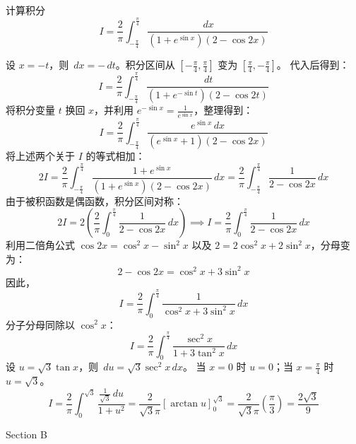 \begin{questions}
\question
计算积分
\[
I = \frac{2}{\pi} \int_{-\frac{\pi}{4}}^{\frac{\pi}{4}} \frac{\,dx}{\left(1 + e^{\sin x}\right)\left(2 - \cos 2x\right)}
\]
\begin{solution}
设 $x = -t$，则 $\,dx = -\,dt$。积分区间从 $\left[-\frac{\pi}{4}, \frac{\pi}{4}\right]$ 变为 $\left[\frac{\pi}{4}, -\frac{\pi}{4}\right]$。
代入后得到：
\[
I = \frac{2}{\pi} \int_{-\frac{\pi}{4}}^{\frac{\pi}{4}} \frac{\,dt}{\left(1 + e^{-\sin t}\right)\left(2 - \cos 2t\right)}
\]
将积分变量 $t$ 换回 $x$，并利用 $e^{-\sin x} = \frac{1}{e^{\sin x}}$，整理得到：
\[
I = \frac{2}{\pi} \int_{-\frac{\pi}{4}}^{\frac{\pi}{4}} \frac{e^{\sin x} \,dx}{\left(e^{\sin x} + 1\right)\left(2 - \cos 2x\right)}
\]
将上述两个关于 $I$ 的等式相加：
\[
2I = \frac{2}{\pi} \int_{-\frac{\pi}{4}}^{\frac{\pi}{4}} \frac{1 + e^{\sin x}}{\left(1 + e^{\sin x}\right)\left(2 - \cos 2x\right)} \,dx = \frac{2}{\pi} \int_{-\frac{\pi}{4}}^{\frac{\pi}{4}} \frac{1}{2 - \cos 2x} \,dx
\]
由于被积函数是偶函数，积分区间对称：
\[
2I = 2 \left( \frac{2}{\pi} \int_0^{\frac{\pi}{4}} \frac{1}{2 - \cos 2x} \,dx \right) \implies I = \frac{2}{\pi} \int_0^{\frac{\pi}{4}} \frac{1}{2 - \cos 2x} \,dx
\]
利用二倍角公式 $\cos 2x = \cos^2 x - \sin^2 x$ 以及 $2 = 2\cos^2 x + 2\sin^2 x$，分母变为：
\[
2 - \cos 2x = \cos^2 x + 3\sin^2 x
\]
因此，
\[
I = \frac{2}{\pi} \int_0^{\frac{\pi}{4}} \frac{1}{\cos^2 x + 3\sin^2 x} \,dx
\]
分子分母同除以 $\cos^2 x$：
\[
I = \frac{2}{\pi} \int_0^{\frac{\pi}{4}} \frac{\sec^2 x}{1 + 3\tan^2 x} \,dx
\]
设 $u = \sqrt{3}\tan x$，则 $\,du = \sqrt{3}\sec^2 x \,dx$。
当 $x = 0$ 时 $u = 0$；当 $x = \frac{\pi}{4}$ 时 $u = \sqrt{3}$。
\[
I = \frac{2}{\pi} \int_0^{\sqrt{3}} \frac{\frac{1}{\sqrt{3}} \,du}{1 + u^2} = \frac{2}{\sqrt{3}\pi} \left[\arctan u\right]_0^{\sqrt{3}} = \frac{2}{\sqrt{3}\pi} \left(\frac{\pi}{3}\right) = \frac{2\sqrt{3}}{9}
\]
\end{solution}
\question
Section B
\end{questions}
